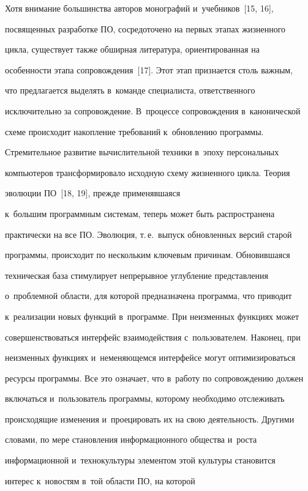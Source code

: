   Хотя внимание большинства авторов монографий и~учебников~[15, 16],

посвященных разработке ПО, сосредоточено на первых этапах жизненного

цикла, существует также обширная литература, ориентированная на

особенности этапа сопровождения~[17]. Этот этап признается столь важным,

что предлагается выделять в~команде специалиста, ответственного

исключительно за сопровождение. В~процессе сопровождения в~канонической

схеме происходит накопление требований к~обновлению программы.



  Стремительное развитие вычислительной техники в~эпоху персональных

компьютеров трансформировало исходную схему жизненного цикла. Теория

эволюции ПО~[18, 19], прежде применявшаяся

к~большим программным сис\-те\-мам, теперь может быть распространена

практически на все ПО. Эволюция, т.\,е.\ выпуск обновленных версий старой

программы, происходит по нескольким ключевым причинам. Обновившаяся

техническая база стимулирует непрерывное углубление представления

о~проблемной области, для которой предназначена программа, что приводит

к~реализации новых функций в~программе. При неизменных функциях может

совершенствоваться интерфейс взаимодействия с~пользователем. Наконец, при

неизменных функциях и~неменяющемся интерфейсе могут оптимизироваться

ресурсы программы. Все это означает, что в~работу по сопровождению должен

включаться и~пользователь программы, которому необходимо отслеживать

происходящие изменения и~проецировать их на свою деятельность. Другими

словами, по мере становления информационного общества и~роста

информационной и~технокультуры элементом этой культуры становится

интерес к~новостям в~той области ПО, на которой

